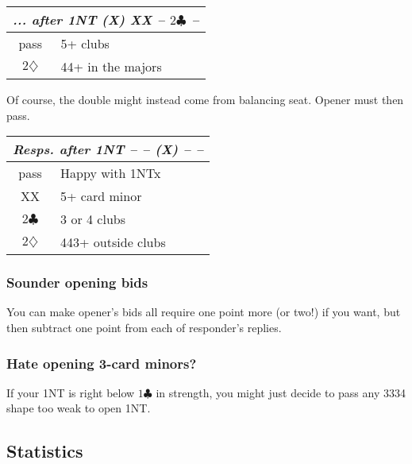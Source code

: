 \documentclass[a4paper, twoside, 11pt]{article}
\begin{document}
\begin{multicols}{3}
\begin{center}
\begin{tabular}{ |c|l| }
 \hline
 \multicolumn{2}{|c|}{\textit{... after \textnormal{1NT} (X) XX -- $2\clubsuit$ --}} \\
 \hline
 pass & 5+ clubs \\
 $2\diamondsuit$ & 44+ in the majors \\

 \hline
\end{tabular}
\end{center}

Of course, the double might instead come from balancing seat. Opener must then pass.

\begin{center}
\begin{tabular}{ |c|l| }
 \hline
 \multicolumn{2}{|c|}{\textit{Resps. after \textnormal{1NT} -- -- (X) -- --}} \\
 \hline
 pass & Happy with \textnormal{1NT}x \\
 XX & 5+ card minor \\
 $2\clubsuit$ & 3 or 4 clubs \\
 $2\diamondsuit$ &  443+ outside clubs \\
 \hline
\end{tabular}
\end{center}


\subsubsection*{Sounder opening bids}
You can make opener's bids all require one point more (or two!) if you want, but then subtract one point from each of responder's replies.

\subsubsection*{Hate opening 3-card minors?}
If your \textnormal{1NT} is right below $1\clubsuit$ in strength, you might just decide to pass any 3334 shape too weak to open \textnormal{1NT}.
\subsection*{Statistics}


\end{multicols}
\end{document}

